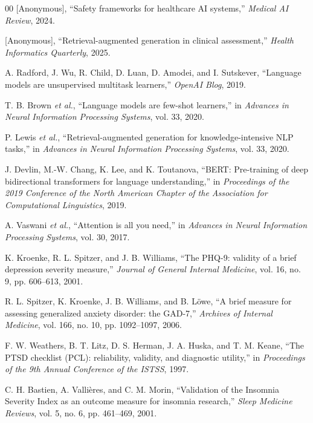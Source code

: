 \documentclass[sigconf]{acmart}
\begin{document}
\begin{thebibliography}{00}
 [Anonymous], ``Safety frameworks for healthcare AI systems,'' \textit{Medical AI Review}, 2024.

 [Anonymous], ``Retrieval-augmented generation in clinical assessment,'' \textit{Health Informatics Quarterly}, 2025.

 A. Radford, J. Wu, R. Child, D. Luan, D. Amodei, and I. Sutskever, ``Language models are unsupervised multitask learners,'' \textit{OpenAI Blog}, 2019.

 T. B. Brown \textit{et al.}, ``Language models are few-shot learners,'' in \textit{Advances in Neural Information Processing Systems}, vol. 33, 2020.

 P. Lewis \textit{et al.}, ``Retrieval-augmented generation for knowledge-intensive NLP tasks,'' in \textit{Advances in Neural Information Processing Systems}, vol. 33, 2020.

 J. Devlin, M.-W. Chang, K. Lee, and K. Toutanova, ``BERT: Pre-training of deep bidirectional transformers for language understanding,'' in \textit{Proceedings of the 2019 Conference of the North American Chapter of the Association for Computational Linguistics}, 2019.

 A. Vaswani \textit{et al.}, ``Attention is all you need,'' in \textit{Advances in Neural Information Processing Systems}, vol. 30, 2017.

 K. Kroenke, R. L. Spitzer, and J. B. Williams, ``The PHQ-9: validity of a brief depression severity measure,'' \textit{Journal of General Internal Medicine}, vol. 16, no. 9, pp. 606--613, 2001.

 R. L. Spitzer, K. Kroenke, J. B. Williams, and B. Löwe, ``A brief measure for assessing generalized anxiety disorder: the GAD-7,'' \textit{Archives of Internal Medicine}, vol. 166, no. 10, pp. 1092--1097, 2006.

 F. W. Weathers, B. T. Litz, D. S. Herman, J. A. Huska, and T. M. Keane, ``The PTSD checklist (PCL): reliability, validity, and diagnostic utility,'' in \textit{Proceedings of the 9th Annual Conference of the ISTSS}, 1997.

 C. H. Bastien, A. Vallières, and C. M. Morin, ``Validation of the Insomnia Severity Index as an outcome measure for insomnia research,'' \textit{Sleep Medicine Reviews}, vol. 5, no. 6, pp. 461--469, 2001.


\end{thebibliography}
\end{document}
